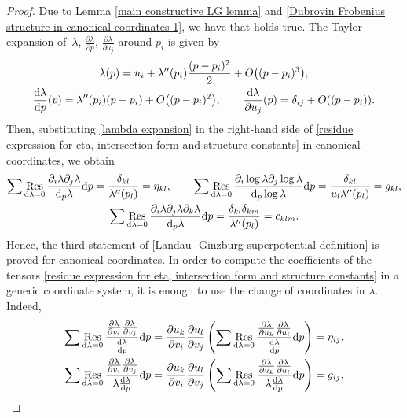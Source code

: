 \documentclass[pdftex]{sigma}
\numberwithin{equation}{section}
\DeclareMathOperator*{\res}{Res}
\begin{document}
\begin{proof}
Due to Lemma \ref{main constructive LG lemma} and \eqref{Dubrovin Frobenius structure in canonical coordinates 1}, we have that
holds true. The Taylor expansion of~$\lambda$, $\frac{\partial \lambda}{\partial p}$, $\frac{\partial \lambda}{\partial u_j}$ around $p_i$ is given by
\begin{gather}
\lambda(p)=u_i+\lambda^{\prime\prime}(p_i)\frac{(p-p_i)^2}{2}+O\bigl( (p-p_i)^3\bigr),\nonumber\\
\frac{{\rm d} \lambda}{{\rm d}p}(p)=\lambda^{\prime\prime}(p_i)(p-p_i)+O\bigl( (p-p_i)^2\bigr),\qquad
\frac{{\rm d} \lambda}{\partial u_j}(p)=\delta_{ij}+O( (p-p_i)).\label{lambda expansion}
\end{gather}
Then, substituting \eqref{lambda expansion} in the right-hand side of \eqref{residue expression for eta, intersection form and structure constants} in canonical coordinates, we obtain
\begin{gather*}%
 \sum \res_{{\rm d}\lambda=0} \frac{ \partial_i\lambda \partial_j\lambda }{{\rm d}_p\lambda }{\rm d}p =\frac{\delta_{kl}}{\lambda^{\prime\prime}(p_l)}=\eta_{kl},\qquad
\sum \res_{{\rm d}\lambda=0} \frac{ \partial_i\log\lambda \partial_j\log\lambda }{{\rm d}_p\log\lambda} {\rm d}p =\frac{\delta_{kl}}{u_l\lambda^{\prime\prime}(p_l)}=g_{kl},\\
\sum \res_{{\rm d}\lambda=0} \frac{ \partial_i\lambda \partial_j\lambda \partial_k\lambda }{{\rm d}_p\lambda}{\rm d}p=\frac{\delta_{kl}\delta_{km}}{\lambda^{\prime\prime}(p_l)}=c_{klm}.
\end{gather*}
Hence, the third statement of \ref{Landau--Ginzburg superpotential definition} is proved for canonical coordinates. In order to compute the coefficients of the tensors \eqref{residue expression for eta, intersection form and structure constants} in a generic coordinate system, it is enough to use the change of coordinates in $\lambda$. Indeed,
\begin{gather*}%
\sum \res_{{\rm d}\lambda=0} \frac{\frac{\partial\lambda}{\partial v_i}\frac{\partial\lambda}{\partial v_j} }{\frac{{\rm d}\lambda}{{\rm d}p} }{\rm d}p=\frac{\partial u_k}{\partial v_i}\frac{\partial u_l}{\partial v_j}\left(\sum \res_{{\rm d}\lambda=0} \frac{\frac{\partial\lambda}{\partial u_k}\frac{\partial\lambda}{\partial u_l} }{\frac{{\rm d}\lambda}{{\rm d}p} }{\rm d}p \right)=\eta_{ij},\\
\sum \res_{{\rm d}\lambda=0} \frac{\frac{\partial\lambda}{\partial v_i}\frac{\partial\lambda}{\partial v_j} }{\lambda\frac{{\rm d}\lambda}{{\rm d}p} }{\rm d}p=\frac{\partial u_k}{\partial v_i}\frac{\partial u_l}{\partial v_j}\left(\sum \res_{{\rm d}\lambda=0} \frac{\frac{\partial\lambda}{\partial u_k}\frac{\partial\lambda}{\partial u_l} }{\lambda \frac{{\rm d}\lambda}{{\rm d}p} }{\rm d}p\right)=g_{ij} ,\\

\end{gather*}
\end{proof}
\end{document}

